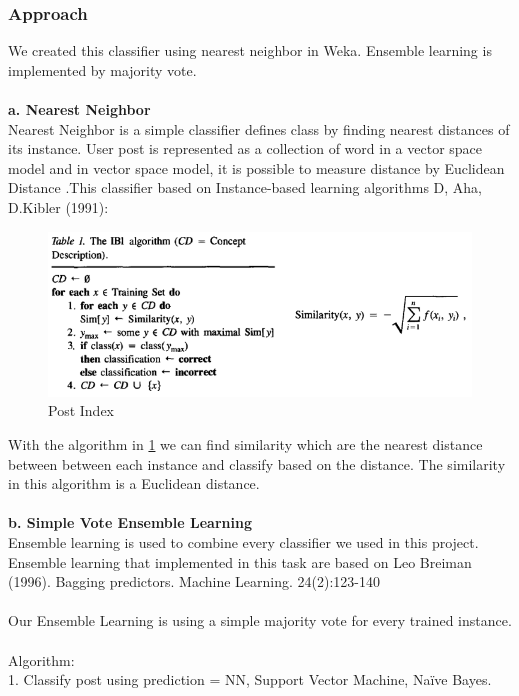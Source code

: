 \subsubsection*{Approach}
	We created this classifier using nearest neighbor in Weka. Ensemble learning is implemented by majority vote.\\\\
	\textbf{a. Nearest Neighbor} \\
		Nearest Neighbor is a simple classifier defines class by finding nearest distances of its instance. User post is represented as a collection of word in a vector space model and in vector space model, it is possible to measure distance by Euclidean Distance .This classifier based on Instance-based learning algorithms D, Aha, D.Kibler (1991): \\
	\begin{figure}[h]
		\begin{center}
			\includegraphics[scale=0.8]{images/NN1.png}
		\caption{Post Index\label{NN1}}
		\end{center}
	\end{figure}
		With the algorithm in \ref{NN1} we can find similarity which are the nearest distance between between each instance and classify based on the distance. The similarity in this algorithm is a Euclidean distance.\\\\
	\textbf{b. Simple Vote Ensemble Learning} \\
		Ensemble learning is used to combine every classifier we used in this project. Ensemble learning that implemented in this task are based on Leo Breiman (1996). Bagging predictors. Machine Learning. 24(2):123-140		\\\\Our Ensemble Learning is using a simple majority vote for every trained instance.\\\\
		Algorithm:\\
		   1. Classify post using prediction = NN, Support Vector Machine, Naïve Bayes.\\
